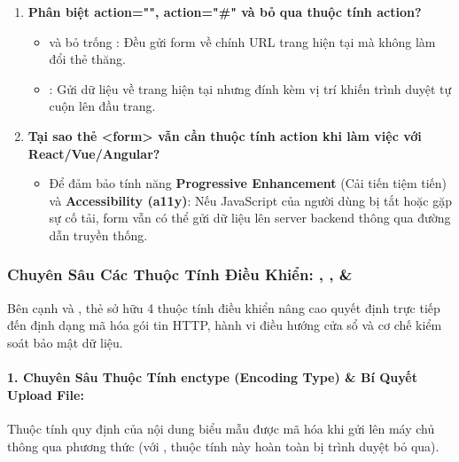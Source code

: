 \begin{noteBox}
\begin{enumerate}[leftmargin=1.5em, itemsep=3pt, parsep=0pt]
    \item \textbf{Phân biệt action="", action="\#" và bỏ qua thuộc tính action?}
    \begin{itemize}[leftmargin=1.2em, itemsep=2pt]
        \item {} và bỏ trống : Đều gửi form về chính URL trang hiện tại mà không làm đổi thẻ thăng.
        \item {}: Gửi dữ liệu về trang hiện tại nhưng đính kèm vị trí \codeinline{\#} khiến trình duyệt tự cuộn lên đầu trang.
    \end{itemize}
    \item \textbf{Tại sao thẻ <form> vẫn cần thuộc tính action khi làm việc với React/Vue/Angular?}
    \begin{itemize}[leftmargin=1.2em, itemsep=2pt]
        \item Để đảm bảo tính năng \textbf{Progressive Enhancement} (Cải tiến tiệm tiến) và \textbf{Accessibility (a11y)}: Nếu JavaScript của người dùng bị tắt hoặc gặp sự cố tải, form vẫn có thể gửi dữ liệu lên server backend thông qua đường dẫn  truyền thống.
    \end{itemize}
\end{enumerate}
\end{noteBox}

\subsubsection{Chuyên Sâu Các Thuộc Tính Điều Khiển: , ,  \& }
\label{subsubsec:form_other_attributes}

Bên cạnh  và , thẻ  sở hữu 4 thuộc tính điều khiển nâng cao quyết định trực tiếp đến định dạng mã hóa gói tin HTTP, hành vi điều hướng cửa sổ và cơ chế kiểm soát bảo mật dữ liệu.

\paragraph{1. Chuyên Sâu Thuộc Tính enctype (Encoding Type) \& Bí Quyết Upload File:}
Thuộc tính  quy định  của nội dung biểu mẫu được mã hóa khi gửi lên máy chủ thông qua phương thức  (với , thuộc tính này hoàn toàn bị trình duyệt bỏ qua).

